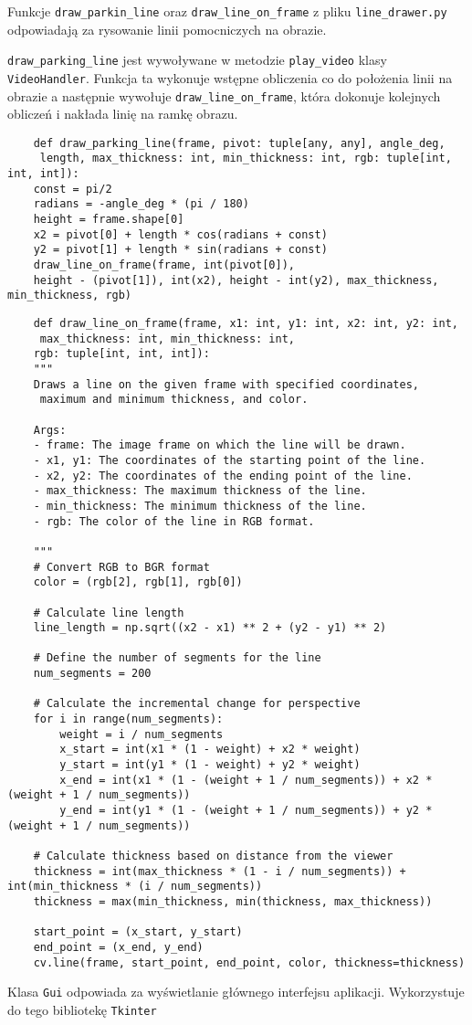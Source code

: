 Funkcje \verb|draw_parkin_line| oraz \verb|draw_line_on_frame| z pliku \verb|line_drawer.py| odpowiadają za rysowanie linii pomocniczych na obrazie.

\verb|draw_parking_line| jest wywoływane w metodzie \verb|play_video| klasy \verb|VideoHandler|.
Funkcja ta wykonuje wstępne obliczenia co do położenia linii na obrazie a następnie wywołuje \verb|draw_line_on_frame|, która dokonuje kolejnych obliczeń i nakłada linię na ramkę obrazu.

\begin{verbatim}
	def draw_parking_line(frame, pivot: tuple[any, any], angle_deg,
	 length, max_thickness: int, min_thickness: int, rgb: tuple[int, int, int]):
	const = pi/2
	radians = -angle_deg * (pi / 180)
	height = frame.shape[0]
	x2 = pivot[0] + length * cos(radians + const)
	y2 = pivot[1] + length * sin(radians + const)
	draw_line_on_frame(frame, int(pivot[0]), 
	height - (pivot[1]), int(x2), height - int(y2), max_thickness, min_thickness, rgb)
\end{verbatim}

\begin{verbatim}
	def draw_line_on_frame(frame, x1: int, y1: int, x2: int, y2: int,
	 max_thickness: int, min_thickness: int,
	rgb: tuple[int, int, int]):
	"""
	Draws a line on the given frame with specified coordinates,
	 maximum and minimum thickness, and color.
	
	Args:
	- frame: The image frame on which the line will be drawn.
	- x1, y1: The coordinates of the starting point of the line.
	- x2, y2: The coordinates of the ending point of the line.
	- max_thickness: The maximum thickness of the line.
	- min_thickness: The minimum thickness of the line.
	- rgb: The color of the line in RGB format.
	
	"""
	# Convert RGB to BGR format
	color = (rgb[2], rgb[1], rgb[0])
	
	# Calculate line length
	line_length = np.sqrt((x2 - x1) ** 2 + (y2 - y1) ** 2)
	
	# Define the number of segments for the line
	num_segments = 200
	
	# Calculate the incremental change for perspective
	for i in range(num_segments):
		weight = i / num_segments
		x_start = int(x1 * (1 - weight) + x2 * weight)
		y_start = int(y1 * (1 - weight) + y2 * weight)
		x_end = int(x1 * (1 - (weight + 1 / num_segments)) + x2 * (weight + 1 / num_segments))
		y_end = int(y1 * (1 - (weight + 1 / num_segments)) + y2 * (weight + 1 / num_segments))
	
	# Calculate thickness based on distance from the viewer
	thickness = int(max_thickness * (1 - i / num_segments)) + int(min_thickness * (i / num_segments))
	thickness = max(min_thickness, min(thickness, max_thickness))
	
	start_point = (x_start, y_start)
	end_point = (x_end, y_end)
	cv.line(frame, start_point, end_point, color, thickness=thickness)
\end{verbatim}

Klasa \verb|Gui| odpowiada za wyświetlanie głównego interfejsu aplikacji. Wykorzystuje do tego bibliotekę \verb|Tkinter|




